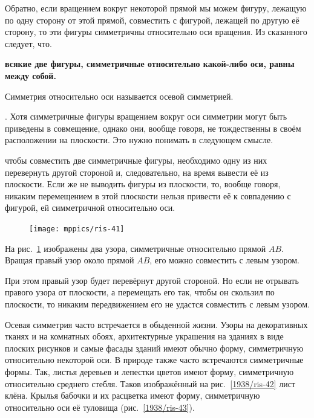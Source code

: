 \documentclass[oneside]{book}
\begin{document}
Обратно, если вращением вокруг некоторой прямой мы можем фигуру, лежащую по одну сторону от этой прямой, совместить с фигурой, лежащей по другую её сторону, то эти фигуры симметричны относительно оси вращения.
Из сказанного следует, что.

\textbf{всякие две фигуры, симметричные относительно какой-либо оси, равны между собой.}

Симметрия относительно оси называется осевой симметрией. %

.
Хотя симметричные фигуры вращением вокруг оси симметрии могут быть приведены в совмещение, однако они, вообще говоря, не тождественны в своём расположении на плоскости.
Это нужно понимать в следующем смысле.

чтобы совместить две симметричные фигуры, необходимо одну из них перевернуть другой стороной и, следовательно, на время вывести её из плоскости.
Если же не выводить фигуры из плоскости, то, вообще говоря, никаким перемещением в этой плоскости нельзя привести её к совпадению с фигурой, ей симметричной относительно оси.

\begin{figure}
\centering
\texttt{[image: mppics/ris-41]}
\caption{}\label{1938/ris-41}
\end{figure}

На рис.~\ref{1938/ris-41} изображены два узора, симметричные относительно прямой $AB$.
Вращая правый узор около прямой $AB$, его можно совместить с левым узором.

При этом правый узор будет перевёрнут другой стороной.
Но если не отрывать правого узора от плоскости, а перемещать его так, чтобы он скользил по плоскости, то никаким передвижением его не удастся совместить с левым узором.

Осевая симметрия часто встречается в обыденной жизни.
Узоры на декоративных тканях и на комнатных обоях, архитектурные украшения на зданиях в виде плоских рисунков и самые фасады зданий имеют обычно форму, симметричную относительно некоторой оси.
В природе также часто встречаются симметричные формы.
Так, листья деревьев и лепестки цветов имеют форму, симметричную относительно среднего стебля.
Таков изображённый на рис.~\ref{1938/ris-42} лист клёна.
Крылья бабочки и их расцветка имеют форму, симметричную относительно оси её туловища (рис.~\ref{1938/ris-43}).
\end{document}
